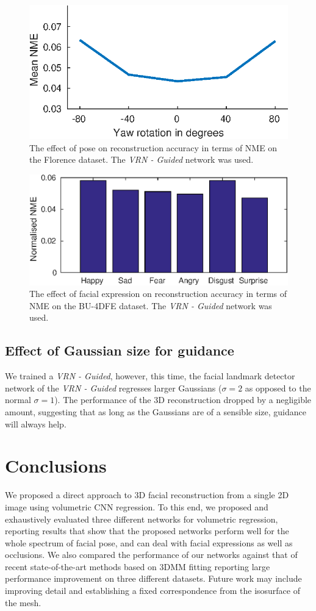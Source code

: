 \begin{figure}
  \centering
  \includegraphics[width=0.5\linewidth]{curves/ablation_pose.eps}
  \caption[Effect of pose]{The effect of pose on reconstruction
    accuracy in terms of NME on the Florence dataset. The \textit{VRN
      - Guided} network was used.}
  \label{fig:effect_pose}
\end{figure}


\begin{figure}
  \centering
  \includegraphics[width=0.7\linewidth]{curves/ablation_expression.eps}
  \caption[Effect of facial expressions]{The effect of facial
    expression on reconstruction accuracy in terms of NME on the
    BU-4DFE dataset. The \textit{VRN - Guided} network was used.}
  \label{fig:effect_expression}
\end{figure}

\subsection{Effect of Gaussian size for guidance} We trained a
\textit{VRN - Guided}, however, this time, the facial landmark
detector network of the \textit{VRN - Guided} regresses larger
Gaussians ($\sigma = 2$ as opposed to the normal $\sigma = 1$). The
performance of the 3D reconstruction dropped by a negligible amount,
suggesting that as long as the Gaussians are of a sensible size,
guidance will always help.



\section{Conclusions}

We proposed a direct approach to 3D facial reconstruction from a
single 2D image using volumetric CNN regression. To this end, we
proposed and exhaustively evaluated three different networks for
volumetric regression, reporting results that show that the proposed
networks perform well for the whole spectrum of facial pose, and can
deal with facial expressions as well as occlusions. We also compared
the performance of our networks against that of recent
state-of-the-art methods based on 3DMM fitting reporting large
performance improvement on three different datasets.  Future work may
include improving detail and establishing a fixed correspondence from
the isosurface of the mesh.


